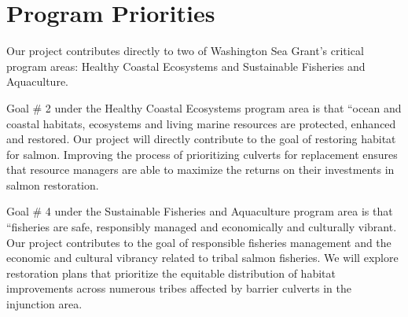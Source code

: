 \documentclass[12pt]{elsarticle}
\begin{document}
\section{Program Priorities} %

Our project contributes directly to two of Washington Sea Grant's critical program areas: Healthy Coastal Ecosystems and Sustainable Fisheries and Aquaculture. 

Goal \# 2 under the Healthy Coastal Ecosystems program area is that ``ocean and coastal habitats, ecosystems and living marine resources are protected, enhanced and restored. Our project will directly contribute to the goal of restoring habitat for salmon. Improving the process of prioritizing culverts for replacement ensures that resource managers are able to maximize the returns on their investments in salmon restoration.

Goal \# 4 under the Sustainable Fisheries and Aquaculture program area is that ``fisheries are safe, responsibly managed and economically and culturally vibrant. Our project contributes to the goal of responsible fisheries management and the economic and cultural vibrancy related to tribal salmon fisheries. We will explore restoration plans that prioritize the equitable distribution of habitat improvements across numerous tribes affected by barrier culverts in the injunction area. 





\clearpage

\end{document}
